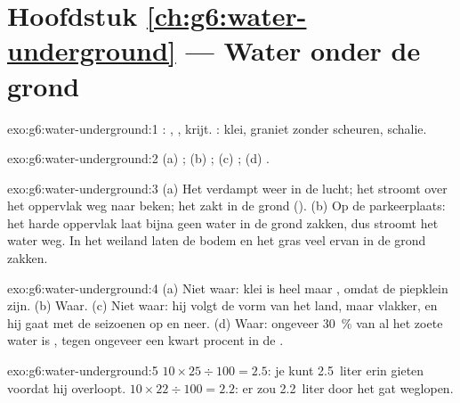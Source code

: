 \section*{Hoofdstuk \ref{ch:g6:water-underground} --- Water onder de grond}

\begin{solution}{exo:g6:water-underground:1}
: , , krijt. : klei, graniet zonder
scheuren, schalie.
\end{solution}

\begin{solution}{exo:g6:water-underground:2}
(a) ; (b) ; (c) ; (d) .
\end{solution}

\begin{solution}{exo:g6:water-underground:3}
(a) Het verdampt weer in de lucht; het stroomt over het oppervlak weg naar
beken; het zakt in de grond (). (b) Op de parkeerplaats: het
harde oppervlak laat bijna geen water in de grond zakken, dus stroomt het
water weg. In het weiland laten de bodem en het gras veel ervan in de grond
zakken.
\end{solution}

\begin{solution}{exo:g6:water-underground:4}
(a) Niet waar: klei is heel  maar , omdat de 
piepklein zijn. (b) Waar. (c) Niet waar: hij volgt de vorm van het land,
maar vlakker, en hij gaat met de seizoenen op en neer. (d) Waar: ongeveer
30~\% van al het zoete water is , tegen ongeveer een kwart
procent in de .
\end{solution}

\begin{solution}{exo:g6:water-underground:5}
$10 \times 25 \div 100 = 2.5$: je kunt 2.5~liter erin gieten voordat hij
overloopt. $10 \times 22 \div 100 = 2.2$: er zou 2.2~liter door het gat
weglopen.
\end{solution}

